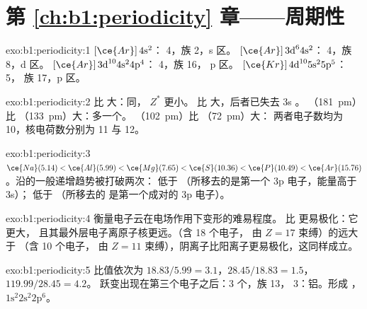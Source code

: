 \section*{第 \ref{ch:b1:periodicity} 章——周期性}

\begin{solution}{exo:b1:periodicity:1}
 $[\ce{Ar}]\,4\text{s}^2$： 4，族 2，s 区。
$[\ce{Ar}]\,3\text{d}^6 4\text{s}^2$： 4，族 8，d 区。
$[\ce{Ar}]\,3\text{d}^{10} 4\text{s}^2 4\text{p}^4$： 4，族 16，
p 区。 $[\ce{Kr}]\,4\text{d}^{10} 5\text{s}^2 5\text{p}^5$： 5，
族 17，p 区。
\end{solution}

\begin{solution}{exo:b1:periodicity:2}
 比  大：同， $Z^{*}$ 更小。
 比  大，后者已失去 3s 。
（\qty{181}{pm}）比 （\qty{133}{pm}）大：多一个。
（\qty{102}{pm}）比 （\qty{72}{pm}）大：
两者电子数均为 10，核电荷数分别为 11 与 12。
\end{solution}

\begin{solution}{exo:b1:periodicity:3}
$\ce{Na} (5.14) < \ce{Al} (5.99) < \ce{Mg} (7.65) < \ce{S} (10.36) <
\ce{P} (10.49) < \ce{Ar} (15.76)$。沿的一般递增趋势被打破两次：
 低于 （所移去的是第一个
3p 电子，能量高于 3s）； 低于 （所移去的
是第一个成对的 3p 电子）。
\end{solution}

\begin{solution}{exo:b1:periodicity:4}
衡量电子云在电场作用下变形的难易程度。
 比  更易极化：它更大，
且其最外层电子离原子核更远。（含 18 个电子，
由 $Z = 17$ 束缚）的远大于 （含 10 个电子，
由 $Z = 11$ 束缚），阴离子比阳离子更易极化，这同样成立。
\end{solution}

\begin{solution}{exo:b1:periodicity:5}
比值依次为 $18.83/5.99 = 3.1$，$28.45/18.83 = 1.5$，$119.99/28.45 = 4.2$。
跃变出现在第三个电子之后：3 个，族 13，
 3：铝。形成 ，$1\text{s}^2 2\text{s}^2
2\text{p}^6$。
\end{solution}


